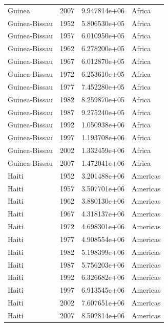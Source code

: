 \documentclass[
  letterpaper,
  DIV=11,
  numbers=noendperiod]{scrreprt}
\begin{document}
\begin{tcolorbox}
\begin{tabular}{lrrl}
Guinea                   &  2007 &  9.947814e+06 &    Africa \\
Guinea-Bissau            &  1952 &  5.806530e+05 &    Africa \\
Guinea-Bissau            &  1957 &  6.010950e+05 &    Africa \\
Guinea-Bissau            &  1962 &  6.278200e+05 &    Africa \\
Guinea-Bissau            &  1967 &  6.012870e+05 &    Africa \\
Guinea-Bissau            &  1972 &  6.253610e+05 &    Africa \\
Guinea-Bissau            &  1977 &  7.452280e+05 &    Africa \\
Guinea-Bissau            &  1982 &  8.259870e+05 &    Africa \\
Guinea-Bissau            &  1987 &  9.275240e+05 &    Africa \\
Guinea-Bissau            &  1992 &  1.050938e+06 &    Africa \\
Guinea-Bissau            &  1997 &  1.193708e+06 &    Africa \\
Guinea-Bissau            &  2002 &  1.332459e+06 &    Africa \\
Guinea-Bissau            &  2007 &  1.472041e+06 &    Africa \\
Haiti                    &  1952 &  3.201488e+06 &  Americas \\
Haiti                    &  1957 &  3.507701e+06 &  Americas \\
Haiti                    &  1962 &  3.880130e+06 &  Americas \\
Haiti                    &  1967 &  4.318137e+06 &  Americas \\
Haiti                    &  1972 &  4.698301e+06 &  Americas \\
Haiti                    &  1977 &  4.908554e+06 &  Americas \\
Haiti                    &  1982 &  5.198399e+06 &  Americas \\
Haiti                    &  1987 &  5.756203e+06 &  Americas \\
Haiti                    &  1992 &  6.326682e+06 &  Americas \\
Haiti                    &  1997 &  6.913545e+06 &  Americas \\
Haiti                    &  2002 &  7.607651e+06 &  Americas \\
Haiti                    &  2007 &  8.502814e+06 &  Americas \\

\end{tabular}
\end{tcolorbox}
\end{document}
